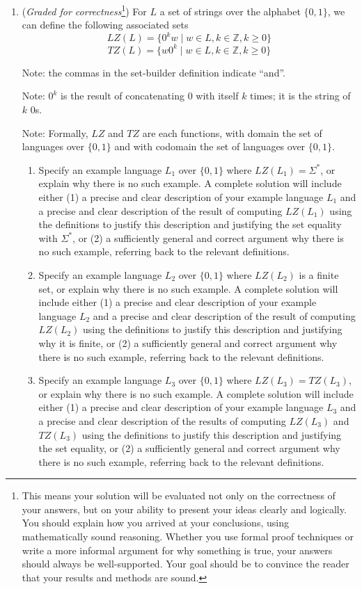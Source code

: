 \begin{enumerate}
\item ({\it Graded for correctness}\footnote{This means your solution will be
evaluated not only on the correctness of your answers, but on your ability to 
present your ideas clearly and logically. You should explain how you arrived at 
your conclusions, using 
mathematically sound reasoning. Whether you use formal proof techniques or 
write a more informal argument for why 
something is true, your answers should always be well-supported. Your goal 
should be to convince the reader that 
your results and methods are sound.}) 
For $L$ a set of strings over the alphabet $\{0,1\}$, we can define the following associated sets
\[
LZ(L) = \{ 0^k w \mid w \in L, k \in \mathbb{Z}, k \geq 0 \}
\]
\[
TZ(L) = \{ w 0^k \mid w \in L, k \in \mathbb{Z}, k \geq 0 \}
\]

Note: the commas in the set-builder definition indicate ``and''.

Note: $0^k$ is the result of concatenating $0$ with itself $k$ times; it is the string of $k$ $0$s.

Note: Formally, $LZ$ and $TZ$ are each functions, with domain the set of languages over $\{0,1\}$ and with codomain 
the set of languages over $\{0,1\}$.

\begin{enumerate}
\item Specify an example language $L_1$ over $\{0,1\}$ where $LZ(L_1) = \Sigma^*$, or explain why there is no such 
example. A complete solution will include either (1) a precise and clear 
description of your example language $L_1$ and a precise and clear description of the result of computing $LZ(L_1)$
using the definitions to justify this description and justifying the set equality with $\Sigma^*$, or (2) a sufficiently
general and correct argument why there is no such example, referring back to the relevant definitions.
\item Specify an example language $L_2$ over $\{0,1\}$ where $LZ(L_2)$ is a finite set, or explain why there is no such 
example. A complete solution will include either (1) a precise and clear 
description of your example language $L_2$ and a precise and clear description of the result of computing $LZ(L_2)$
using the definitions to justify this description and justifying why it is finite, or (2) a sufficiently
general and correct argument why there is no such example, referring back to the relevant definitions.
\item Specify an example language $L_3$ over $\{0,1\}$ where $LZ(L_3) = TZ(L_3)$, or explain why there is no such 
example. A complete solution will include either (1) a precise and clear 
description of your example language $L_3$ and a precise and clear description of the results of computing $LZ(L_3)$
and $TZ(L_3)$ using the definitions to justify this description and justifying the set equality, or (2) a sufficiently
general and correct argument why there is no such example, referring back to the relevant definitions.
\end{enumerate}


\end{enumerate}
